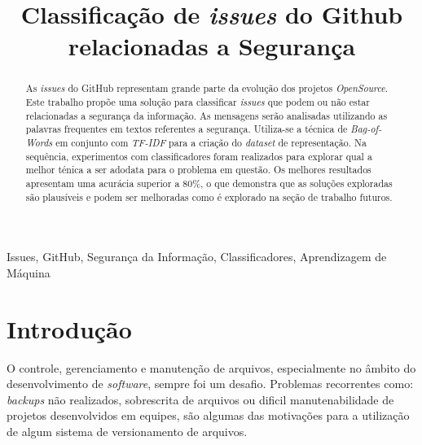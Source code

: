 \documentclass[conference]{IEEEtran}
\begin{document}
\title{Classificação de \textit{issues} do Github relacionadas a Segurança}

\author{
    \and
}

\maketitle

\begin{abstract}
    As \textit{issues} do GitHub representam grande parte da evolução dos projetos \textit{OpenSource}. Este trabalho propõe uma solução para classificar \textit{issues} que podem ou não estar relacionadas a segurança da informação. As mensagens serão analisadas utilizando as palavras frequentes em textos referentes a segurança. Utiliza-se a técnica de \textit{Bag-of-Words} em conjunto com \textit{TF-IDF} para a criação do \textit{dataset} de representação. Na sequência, experimentos com  classificadores foram realizados para explorar qual a melhor ténica a ser adodata para o problema em questão. Os melhores resultados apresentam uma acurácia superior a 80\%, o que demonstra que as soluções exploradas são plausíveis e podem ser melhoradas como é explorado na seção de trabalho futuros.
\end{abstract}

\begin{IEEEkeywords}
    Issues, GitHub, Segurança da Informação, Classificadores, Aprendizagem de Máquina
\end{IEEEkeywords}

\section{Introdução}

O controle, gerenciamento e manutenção de arquivos, especialmente no âmbito do desenvolvimento de \textit{software}, sempre foi um desafio. Problemas recorrentes como: \textit{backups} não realizados, sobrescrita de arquivos ou dificil manutenabilidade de projetos desenvolvidos em equipes, são algumas das motivações para a utilização de algum sistema de versionamento de arquivos. \cite{Scott:ProGit}
\end{document}
